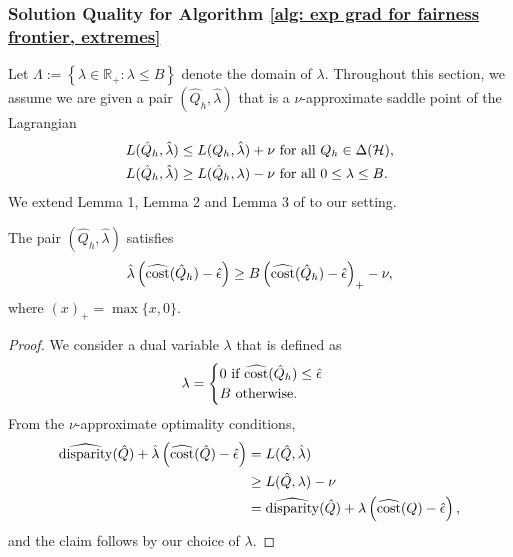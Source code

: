 \documentclass{article}
\begin{document}
\subsubsection{Solution Quality for Algorithm \ref{alg: exp grad for fairness frontier, extremes}} \label{section: solution quality for algorithm exp grad}

Let $\Lambda := \left\{ \lambda \in \mathbb{R}_{+} \colon \lambda \leq B \right\}$ denote the domain of $\lambda$. Throughout this section, we assume we are given a pair $(\hat{Q}_h, \hat{\lambda})$ that is a $\nu$-approximate saddle point of the Lagrangian
    \begin{align*}
        & L(\hat{Q}_h, \hat{\lambda}) \leq L(Q_h, \hat \lambda) + \nu \mbox{ for all } Q_h \in \Delta(\mathcal{H}), \\
        & L(\hat{Q}_h, \hat{\lambda}) \geq L(\hat{Q}_h, \lambda) - \nu \mbox{ for all } 0 \leq \lambda \leq B.
    \end{align*}
We extend Lemma 1, Lemma 2 and Lemma 3 of \cite{agarwal2018reductions} to our setting.

\begin{lemma}\label{lemma: lemma 1 of fair classification, extremes}
    The pair $(\hat{Q}_h, \hat{\lambda})$ satisfies
        \begin{equation*}
            \hat{\lambda} \left( \widehat{\operatorname{cost}}(\hat{Q}_h) - \hat{\epsilon} \right) \geq B \left( \widehat{\operatorname{cost}}(\hat{Q}_h) - \hat{\epsilon} \right)_{+} - \nu,
        \end{equation*}
    where $\left(x\right)_{+} = \max\{x, 0\}$.
    
    \begin{proof}
        We consider a dual variable $\lambda$ that is defined as
            \begin{equation*}
                \lambda = \begin{cases}
                    0 \mbox{ if } \widehat{\operatorname{cost}}(\hat{Q}_h) \leq \hat{\epsilon} \\
                    B \mbox{ otherwise}.
                \end{cases}
            \end{equation*}
        From the $\nu$-approximate optimality conditions,
            \begin{align*}
                \widehat{\operatorname{disparity}}(\hat{Q}) + \hat{\lambda} \left( \widehat{\operatorname{cost}}(\hat{Q}) - \hat{\epsilon} \right) &= L(\hat{Q}, \hat{\lambda}) \\
                &\geq L(\hat{Q}, \lambda) - \nu \\
                &= \widehat{\operatorname{disparity}}(\hat{Q}) + \lambda \left( \widehat{\operatorname{cost}}(Q) - \hat{\epsilon} \right),
            \end{align*}
        and the claim follows by our choice of $\lambda$. 
    \end{proof}
\end{lemma}
\end{document}
